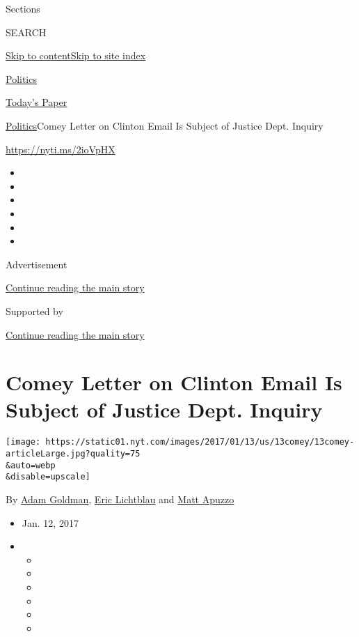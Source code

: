Sections

SEARCH

\protect\hyperlink{site-content}{Skip to
content}\protect\hyperlink{site-index}{Skip to site index}

\href{https://www.nytimes.com/section/politics}{Politics}

\href{https://myaccount.nytimes.com/auth/login?response_type=cookie\&client_id=vi}{}

\href{https://www.nytimes.com/section/todayspaper}{Today's Paper}

\href{/section/politics}{Politics}\textbar{}Comey Letter on Clinton
Email Is Subject of Justice Dept. Inquiry

\url{https://nyti.ms/2ioVpHX}

\begin{itemize}
\item
\item
\item
\item
\item
\item
\end{itemize}

Advertisement

\protect\hyperlink{after-top}{Continue reading the main story}

Supported by

\protect\hyperlink{after-sponsor}{Continue reading the main story}

\hypertarget{comey-letter-on-clinton-email-is-subject-of-justice-dept-inquiry}{%
\section{Comey Letter on Clinton Email Is Subject of Justice Dept.
Inquiry}\label{comey-letter-on-clinton-email-is-subject-of-justice-dept-inquiry}}

\texttt{[image: https://static01.nyt.com/images/2017/01/13/us/13comey/13comey-articleLarge.jpg?quality=75\\\&auto=webp\\\&disable=upscale]}

By \href{https://www.nytimes.com/by/adam-goldman}{Adam Goldman},
\href{http://www.nytimes.com/by/eric-lichtblau}{Eric Lichtblau} and
\href{http://www.nytimes.com/by/matt-apuzzo}{Matt Apuzzo}

\begin{itemize}
\item
  Jan. 12, 2017
\item
  \begin{itemize}
  \item
  \item
  \item
  \item
  \item
  \item
  \end{itemize}
\end{itemize}

